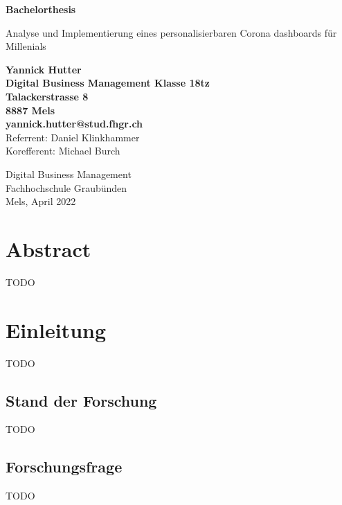 \documentclass[12pt, oneside]{article}
\begin{document}
\begin{titlepage}
	\begin{center}
		\Huge
		\textbf{Bachelorthesis}
		
		\vspace{0.5cm}
		\LARGE
		Analyse und Implementierung eines personalisierbaren Corona dashboards für Millenials
		
		\vspace{1.5cm}
		\normalsize
		\textbf{Yannick Hutter}\\
		\textbf{Digital Business Management Klasse 18tz}\\
		\textbf{Talackerstrasse 8}\\
		\textbf{8887 Mels}\\
		\textbf{yannick.hutter@stud.fhgr.ch}\\

		
		\vfill
		Referrent: Daniel Klinkhammer\\
		Korefferent: Michael Burch\\
		
		\vspace{0.8cm}
		
		
		Digital Business Management\\
		Fachhochschule Graubünden\\
		Mels, April 2022
	\end{center}
\end{titlepage}

\clearpage
\section*{Abstract}
TODO


\clearpage
\tableofcontents
\listoffigures
\listoftables

\clearpage
\printglossaries



\clearpage
{}

\section{Einleitung}
TODO

\subsection{Stand der Forschung}
TODO

\subsection{Forschungsfrage}
TODO
\end{document}
